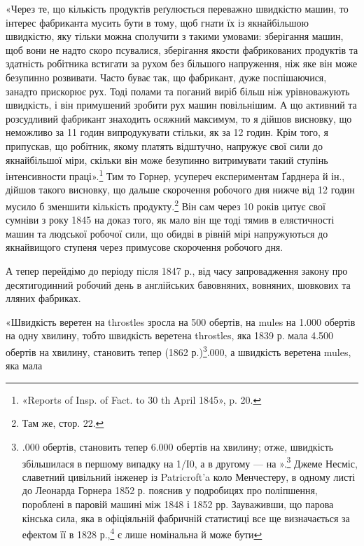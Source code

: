«Через те, що кількість продуктів реґулюється переважно
швидкістю машин, то інтерес фабриканта мусить бути в тому,
щоб гнати їх із якнайбільшою швидкістю, яку тільки можна
сполучити з такими умовами: зберігання машин, щоб вони не
надто скоро псувалися, зберігання якости фабрикованих продуктів
та здатність робітника встигати за рухом без більшого напруження,
ніж яке він може безупинно розвивати. Часто буває так,
що фабрикант, дуже поспішаючися, занадто прискорює рух.
Тоді полами та поганий виріб більш ніж урівноважують швидкість,
і він примушений зробити рух машин повільнішим. А що
активний та розсудливий фабрикант знаходить осяжний максимум,
то я дійшов висновку, що неможливо за 11 годин випродукувати
стільки, як за 12 годин. Крім того, я припускав, що робітник,
якому платять відштучно, напружує свої сили до якнайбільшої
міри, скільки він може безупинно витримувати такий
ступінь інтенсивности праці».\footnote{
«Reports of Insp. of Fact. to 30 th April 1845», p. 20.
} Тим то Горнер, усупереч експериментам
Ґарднера й ін., дійшов такого висновку, що дальше скорочення
робочого дня нижче від 12 годин мусило б зменшити
кількість продукту.\footnote{
Там же, стор. 22.
} Він сам через 10 років цитує свої сумніви
з року 1845 на доказ того, як мало він ще тоді тямив в елястичності
машин та людської робочої сили, що обидві в рівній мірі
напружуються до якнайвищого ступеня через примусове скорочення
робочого дня.

А тепер перейдімо до періоду після 1847 р., від часу запровадження
закону про десятигодинний робочий день в англійських
бавовняних, вовняних, шовкових та лляних фабриках.

«Швидкість веретен на throstles зросла на 500 обертів, на
mules на 1.000 обертів на одну хвилину, тобто швидкість веретена
throstles, яка 1839 р. мала 4.500 обертів на хвилину, становить
тепер (1862 р.)\footnote{
.000 обертів, становить тепер 6.000 обертів на хвилину; отже,
швидкість збільшилася в першому випадку на 1/І0, а в другому —
на ».\footnote{
«Reports of Insp. of Fact. for 31 st October 1862», p. 62.
} Джеме Несміс, славетний цивільний інженер із
Patricroft’a коло Менчестеру, в одному листі до Леонарда Горнера
1852 р. пояснив у подробицях про поліпшення, пороблені в паровій
машині між 1848 і 1852 рр. Зауваживши, що парова кінська
сила, яка в офіціяльній фабричній статистиці все ще визначається
за ефектом її в 1828 р.,\footnote{
Це змінилося від часу «Parliamentary Return»\footnote*{
— парляментського звіту. \emph{Ред.}
} 1862 p. Тут
виступає справжня парова кінська сила сучасних парових машин та водяних
коліс на місце номінальної (див. примітку 109а, стор. 318). І веретен
на сукання (Dublierspindeln) уже не переплутують із прядільними веретенами
у власному значенні (як у «Returns» 1839, 1850 та 1856); далі
для вовняних фабрик подано число «gigs»,\footnote*{
— ворсувальних машин. \emph{Ред.}
} заведено ріжницю між джу-
} є лише номінальна й може бути
}.000, а швидкість веретена mules, яка мала